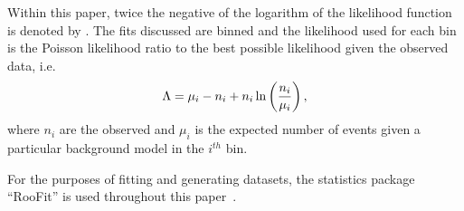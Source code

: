 Within this paper, twice the negative of the logarithm of the likelihood
function is denoted by \nll. The fits discussed are binned and the 
likelihood used for each bin is the Poisson likelihood ratio to the best
possible likelihood given the observed data, i.e.
\begin{equation}
{\rm \nll} = \mu_i - n_i + n_i \ln\left(\frac{n_i}{\mu_i}\right),
\label{eqn:introduction:def2NLL}
\end{equation}
where $n_{i}$ are the observed and $\mu_{i}$ is the expected number of events 
given a particular background model in the $i^{th}$ bin. 

For the purposes of fitting and generating datasets, the statistics package 
``RooFit'' is used throughout this paper~\cite{ref:roofit}. 

